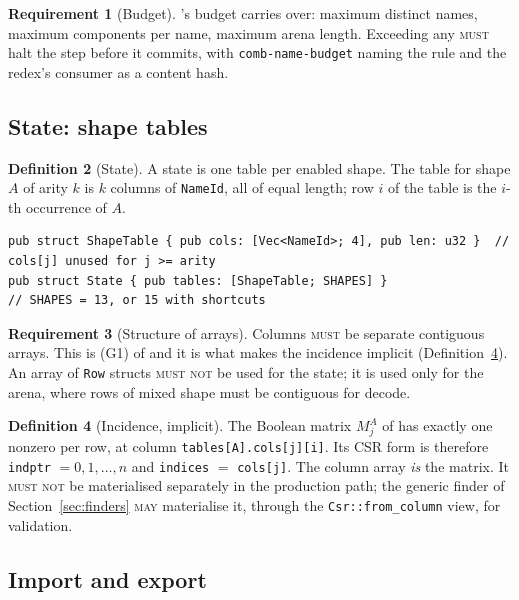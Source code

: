 \documentclass[11pt,a4paper]{article}
\newcommand{\code}[1]{\texttt{#1}}
\newcommand{\MUST}{\textsc{must}}
\newcommand{\MUSTNOT}{\textsc{must not}}
\newcommand{\MAY}{\textsc{may}}
\theoremstyle{definition}
\newtheorem{definition}{Definition}[section]
\newtheorem{requirement}[definition]{Requirement}
\theoremstyle{plain}
\begin{document}
\begin{requirement}[Budget]\label{req:budget}
\cite[Req.~8.8]{combspec}'s budget carries over: maximum distinct names,
maximum components per name, maximum arena length. Exceeding any \MUST{} halt
the step before it commits, with \code{comb-name-budget} naming the rule and
the redex's consumer as a content hash.
\end{requirement}

\subsection{State: shape tables}

\begin{definition}[State]\label{def:state}
A state is one table per enabled shape. The table for shape $A$ of arity $k$
is $k$ columns of \code{NameId}, all of equal length; row $i$ of the table is
the $i$-th occurrence of $A$.
\end{definition}

\begin{lstlisting}
pub struct ShapeTable { pub cols: [Vec<NameId>; 4], pub len: u32 }  // cols[j] unused for j >= arity
pub struct State { pub tables: [ShapeTable; SHAPES] }                 // SHAPES = 13, or 15 with shortcuts
\end{lstlisting}

\begin{requirement}[Structure of arrays]\label{req:soa}
Columns \MUST{} be separate contiguous arrays. This is (G1) of
\cite[\S2.1]{matnote} and it is what makes the incidence implicit
(Definition~\ref{def:inc}). An array of \code{Row} structs \MUSTNOT{} be used
for the state; it is used only for the arena, where rows of mixed shape
must be contiguous for decode.
\end{requirement}

\begin{definition}[Incidence, implicit]\label{def:inc}
The Boolean matrix $M^{A}_{j}$ of \cite[Def.~7.1]{matnote} has exactly one
nonzero per row, at column \code{tables[A].cols[j][i]}. Its CSR form is
therefore \code{indptr} $= 0,1,\dots,n$ and \code{indices}
$=$ \code{cols[j]}. The column array \emph{is} the matrix. It \MUSTNOT{} be
materialised separately in the production path; the generic finder of
Section~\ref{sec:finders} \MAY{} materialise it, through the
\code{Csr::from\_column} view, for validation.
\end{definition}

\subsection{Import and export}
\end{document}
